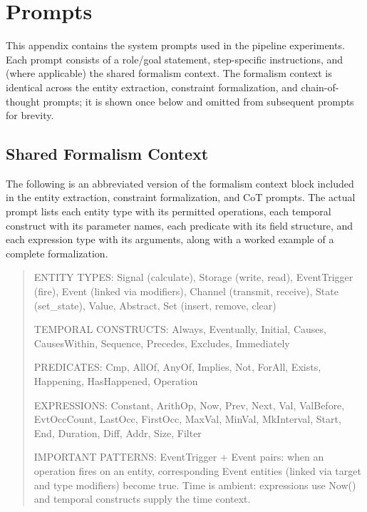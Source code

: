 \section{Prompts}
\label{app:prompts}

This appendix contains the system prompts used in the pipeline
experiments. Each prompt consists of a role/goal statement,
step-specific instructions, and (where applicable) the shared formalism
context. The formalism context is identical across the entity
extraction, constraint formalization, and chain-of-thought prompts; it
is shown once below and omitted from subsequent prompts for brevity.

\subsection{Shared Formalism Context}
\label{app:formalism-context}

The following is an abbreviated version of the formalism context block
included in the entity extraction, constraint formalization, and CoT
prompts. The actual prompt lists each entity type with its permitted
operations, each temporal construct with its parameter names, each
predicate with its field structure, and each expression type with its
arguments, along with a worked example of a complete formalization.

{\footnotesize\ttfamily
\begin{quote}
ENTITY TYPES:
Signal (calculate), Storage (write, read),
EventTrigger (fire), Event (linked via modifiers),
Channel (transmit, receive), State (set\_state),
Value, Abstract, Set (insert, remove, clear)

TEMPORAL CONSTRUCTS:
Always, Eventually, Initial, Causes, CausesWithin,
Sequence, Precedes, Excludes, Immediately

PREDICATES:
Cmp, AllOf, AnyOf, Implies, Not, ForAll, Exists,
Happening, HasHappened, Operation

EXPRESSIONS:
Constant, ArithOp, Now, Prev, Next,
Val, ValBefore, EvtOccCount, LastOcc, FirstOcc,
MaxVal, MinVal, MkInterval, Start, End, Duration,
Diff, Addr, Size, Filter

IMPORTANT PATTERNS:
EventTrigger + Event pairs: when an operation fires
on an entity, corresponding Event entities (linked
via target and type modifiers) become true.
Time is ambient: expressions use Now() and temporal
constructs supply the time context.
\end{quote}
}

